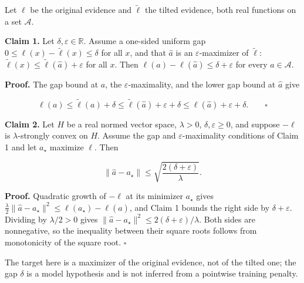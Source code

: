 \documentclass[11pt,a4paper]{report}
\begin{document}
Let \(\ell\) be the original evidence and \(\tilde\ell\) the tilted evidence, both real functions on a set \(\mathcal A\).




\textbf{Claim 1.} Let \(\delta,\varepsilon\in\mathbb R\). Assume a one-sided uniform gap \(0\le\ell(x)-\tilde\ell(x)\le\delta\) for all \(x\), and that \(\hat a\) is an \(\varepsilon\)-maximizer of \(\tilde\ell\): \(\tilde\ell(x)\le\tilde\ell(\hat a)+\varepsilon\) for all \(x\). Then \(\ell(a)-\ell(\hat a)\le\delta+\varepsilon\) for every \(a\in\mathcal A\).




\textbf{Proof.} The gap bound at \(a\), the \(\varepsilon\)-maximality, and the lower gap bound at \(\hat a\) give


\[\ell(a)\le\tilde\ell(a)+\delta\le\tilde\ell(\hat a)+\varepsilon+\delta\le\ell(\hat a)+\varepsilon+\delta.\qquad\square\]


\textbf{Claim 2.} Let \(H\) be a real normed vector space, \(\lambda>0\), \(\delta,\varepsilon\ge0\), and suppose \(-\ell\) is \(\lambda\)-strongly convex on \(H\). Assume the gap and \(\varepsilon\)-maximality conditions of Claim 1 and let \(a_\star\) maximize \(\ell\). Then


\[\|\hat a-a_\star\|\le\sqrt{\frac{2(\delta+\varepsilon)}\lambda}.\]


\textbf{Proof.} Quadratic growth of \(-\ell\) at its minimizer \(a_\star\) gives \(\frac\lambda2\|\hat a-a_\star\|^2\le\ell(a_\star)-\ell(\hat a)\), and Claim 1 bounds the right side by \(\delta+\varepsilon\). Dividing by \(\lambda/2>0\) gives \(\|\hat a-a_\star\|^2\le2(\delta+\varepsilon)/\lambda\). Both sides are nonnegative, so the inequality between their square roots follows from monotonicity of the square root. \(\square\)




The target here is a maximizer of the original evidence, not of the tilted one; the gap \(\delta\) is a model hypothesis and is not inferred from a pointwise training penalty.
\end{document}
